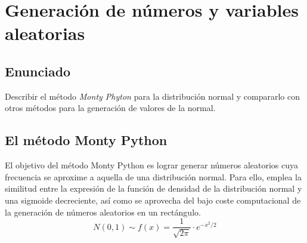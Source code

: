 \documentclass[a4paper,12pt]{article}
\begin{document}
	
	\setlength{\parindent}{0.5cm}
	\setlength{\voffset}{-2cm}
	\setlength{\hoffset}{-2cm}
	
	
	
	
	\tableofcontents
	
\newpage
	\section{Generación de números y variables aleatorias}
	
	\subsection{Enunciado}
	
	Describir el método \textit{Monty Phyton} para la distribución normal y compararlo con otros métodos para la generación de valores de la normal.
	
	\subsection{El método Monty Python}
	
	El objetivo del método Monty Python es lograr generar números aleatorios cuya frecuencia se aproxime a aquella de una distribución normal. Para ello, emplea la similitud entre la expresión de la función de densidad de la distribución normal y una sigmoide decreciente, así como se aprovecha del bajo coste computacional de la generación de números aleatorios en un rectángulo.
	$$ N(0,1) \sim f(x) = \dfrac{1}{\sqrt{2\pi}} \cdot e^{-x^2/2} $$
	
\end{document}
